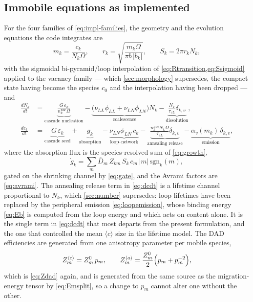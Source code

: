 \documentclass{article}
\newcommand{\aloop}{\ensuremath{\langle a\rangle}}
\newcommand{\cloop}{\ensuremath{\langle c\rangle}}
\begin{document}
\subsection{Immobile equations as implemented}
\label{sec:implemented-eqs}

For the four families of \cref{eq:impl-families}, the geometry and the evolution
equations the code integrates are
\begin{equation}
m_k = \frac{c_k}{N_k \Omega},
\qquad
r_k = \sqrt{\frac{m_k \Omega}{\pi b\,|b_k|}},
\qquad
S_k = 2\pi r_k N_k ,
\label{eq:geometry}
\end{equation}
with the sigmoidal bi-pyramid/loop interpolation of
\cref{eq:Rtransition,eq:Ssigmoid} applied to the vacancy family --- which
\cref{sec:morphology} supersedes, the compact state having become the species
$c_0$ and the interpolation having been dropped --- and
\begin{align}
\frac{dN_k}{dt} &=
\underbrace{\frac{G\,\varepsilon_k}{n^{\text{nuc}}_k \Omega}}_{\text{cascade nucleation}}
- \underbrace{\bigl(\nu_{LL}\phi_{LL} + \nu_{LN}\phi_{LN}\bigr) N_k}_{\text{coalescence}}
- \underbrace{\frac{N_k}{\tau_{vL}}\delta_{k,v}}_{\text{dissolution}} ,
\label{eq:dNdt}\\[1mm]
\frac{dc_k}{dt} &=
\underbrace{G\,\varepsilon_k}_{\text{cascade seed}}
+ \underbrace{\dot{g}_k}_{\text{absorption}}
- \underbrace{\nu_{LN}\phi_{LN}\,c_k}_{\text{loop--network}}
- \underbrace{\frac{n^{\text{nuc}}_k N_k \Omega}{\tau_{vL}}\delta_{k,v}}_{\text{annealing release}}
- \underbrace{\alpha_v(m_k)\,\delta_{k,v}}_{\text{emission}} ,
\label{eq:dcdt}
\end{align}
where the absorption flux is the species-resolved sum of \cref{eq:growth},
\begin{equation}
\dot{g}_k = \sum_m \overline{D}_m\, Z_{km}\, S_k\, c_m\, |m| \,\mathrm{sgn}_k(m),
\label{eq:gdot}
\end{equation}
gated on the shrinking channel by \cref{eq:gate}, and the Avrami factors are
\cref{eq:avrami}. The annealing release term in \cref{eq:dcdt} is a lifetime
channel proportional to $N_k$, which \cref{sec:number} supersedes: loop
lifetimes have been replaced by the peripheral emission
\cref{eq:loopemission}, whose binding energy \cref{eq:Eb} is computed from the
loop energy and which acts on content alone. It is the single term in
\cref{eq:dcdt} that most departs from the present formulation, and the one that
controlled the mean \cloop{} size in the lifetime model. The DAD efficiencies are generated
from one anisotropy parameter per mobile species,
\begin{equation}
Z^{\cloop}_m = Z^0_m\,p_m ,
\qquad
Z^{\aloop}_m = \frac{Z^0_m}{2}\Bigl(p_m + p_m^{-2}\Bigr),
\label{eq:dad}
\end{equation}
which is \cref{eq:Zdad} again, and is generated from the same source as the
migration-energy tensor by \cref{eq:Emsplit}, so a change to $p_m$ cannot alter
one without the other.
\end{document}
